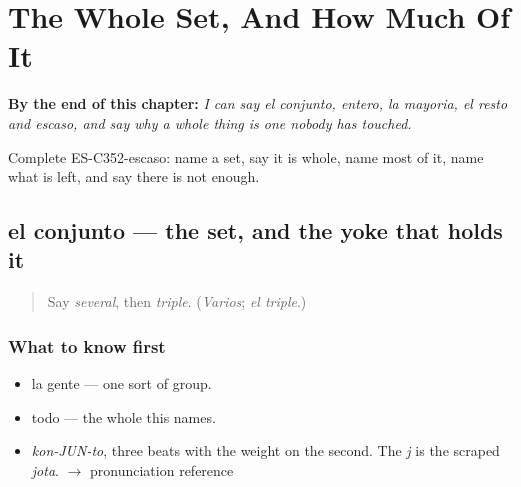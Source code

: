 
\chapter{The Whole Set, And How Much Of It}
\label{ch:el-conjunto-y-el-resto}

\begin{chapteropening}
\textbf{By the end of this chapter:} \emph{I can say el conjunto, entero, la mayoria, el resto and escaso, and say why a whole thing is one nobody has touched.}

Complete ES-C352-escaso: name a set, say it is whole, name most of it, name what is left, and say there is not enough.
\end{chapteropening}

\section[el conjunto]{el conjunto — the set, and the yoke that holds it}

\label{lesson:ES-C352-conjunto}



\begin{quote}
Say \emph{several}, then \emph{triple}. (\emph{Varios}; \emph{el triple}.)
\end{quote}

\subsection*{What to know first}
\begin{itemize}
\raggedright
  \item la gente — one sort of group.
  \item todo — the whole this names.
\end{itemize}

\begin{sounds}
\begin{itemize}
\raggedright
  \item \emph{kon-JUN-to}, three beats with the weight on the second. The \emph{j} is the scraped \emph{jota}. $\to$ pronunciation reference
\end{itemize}
\end{sounds}

